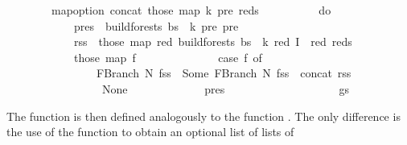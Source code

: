 \begin{isabellebody}
\ \ \ \ \ \ \ \ map{\isacharunderscore}{\kern0pt}option\ concat\ {\isacharparenleft}{\kern0pt}those\ {\isacharparenleft}{\kern0pt}map\ {\isacharparenleft}{\kern0pt}{\isasymlambda}{\isacharparenleft}{\kern0pt}{\isacharparenleft}{\kern0pt}k{\isacharprime}{\kern0pt}{\isacharcomma}{\kern0pt}\ pre{\isacharparenright}{\kern0pt}{\isacharcomma}{\kern0pt}\ reds{\isacharparenright}{\kern0pt}{\isachardot}{\kern0pt}\isanewline
\ \ \ \ \ \ \ \ \ \ do\ {\isacharbraceleft}{\kern0pt}\isanewline
\ \ \ \ \ \ \ \ \ \ \ \ pres\ {\isasymleftarrow}\ build{\isacharunderscore}{\kern0pt}forests{\isacharprime}{\kern0pt}\ bs\ {\isasymomega}\ k{\isacharprime}{\kern0pt}\ pre\ {\isacharbraceleft}{\kern0pt}pre{\isacharbraceright}{\kern0pt}{\isacharsemicolon}{\kern0pt}\isanewline
\ \ \ \ \ \ \ \ \ \ \ \ rss\ {\isasymleftarrow}\ those\ {\isacharparenleft}{\kern0pt}map\ {\isacharparenleft}{\kern0pt}{\isasymlambda}red{\isachardot}{\kern0pt}\ build{\isacharunderscore}{\kern0pt}forests{\isacharprime}{\kern0pt}\ bs\ {\isasymomega}\ k\ red\ {\isacharparenleft}{\kern0pt}I\ {\isasymunion}\ {\isacharbraceleft}{\kern0pt}red{\isacharbraceright}{\kern0pt}{\isacharparenright}{\kern0pt}{\isacharparenright}{\kern0pt}\ reds{\isacharparenright}{\kern0pt}{\isacharsemicolon}{\kern0pt}\isanewline
\ \ \ \ \ \ \ \ \ \ \ \ those\ {\isacharparenleft}{\kern0pt}map\ {\isacharparenleft}{\kern0pt}{\isasymlambda}f{\isachardot}{\kern0pt}\isanewline
\ \ \ \ \ \ \ \ \ \ \ \ \ \ case\ f\ of\isanewline
\ \ \ \ \ \ \ \ \ \ \ \ \ \ \ \ FBranch\ N\ fss\ {\isasymRightarrow}\ Some\ {\isacharparenleft}{\kern0pt}FBranch\ N\ {\isacharparenleft}{\kern0pt}fss\ {\isacharat}{\kern0pt}\ {\isacharbrackleft}{\kern0pt}concat\ rss{\isacharbrackright}{\kern0pt}{\isacharparenright}{\kern0pt}{\isacharparenright}{\kern0pt}\isanewline
\ \ \ \ \ \ \ \ \ \ \ \ \ \ {\isacharbar}{\kern0pt}\ {\isacharunderscore}{\kern0pt}\ {\isasymRightarrow}\ None\isanewline
\ \ \ \ \ \ \ \ \ \ \ \ {\isacharparenright}{\kern0pt}\ pres{\isacharparenright}{\kern0pt}\isanewline
\ \ \ \ \ \ \ \ \ \ {\isacharbraceright}{\kern0pt}\isanewline
\ \ \ \ \ \ \ \ {\isacharparenright}{\kern0pt}\ gs{\isacharparenright}{\kern0pt}{\isacharparenright}{\kern0pt}{\isacharparenright}{\kern0pt}{\isacharparenright}{\kern0pt}{\isacharparenright}{\kern0pt}{\isachardoublequoteclose}%
\begin{isamarkuptext}%
The function  is then defined analogously to the function .
The only difference is the use of the function  to obtain an optional list of lists of

\end{isamarkuptext}
\end{isabellebody}
